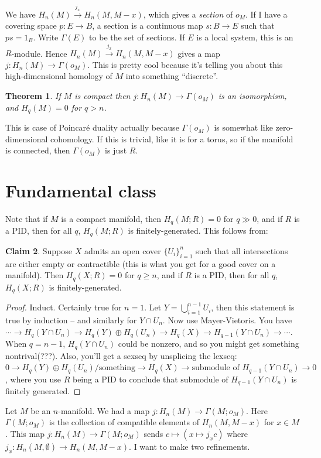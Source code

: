 \documentclass{amsart}
\theoremstyle{theorem}
\newtheorem{theorem}{Theorem}[section]
\theoremstyle{definition}
\newtheorem{claim}[theorem]{Claim}
\begin{document}
We have $H_n(M)\xrightarrow{j_x}H_n(M,M-x)$, which gives a \emph{section} of $o_M$. If I have a covering space $p:E\to B$, a section is a continuous map $s:B\to E$ such that $ps=1_B$. Write $\Gamma(E)$ to be the set of sections. If $E$ is a local system, this is an $R$-module. Hence $H_n(M)\xrightarrow{j_x}H_n(M,M-x)$ gives a map $j:H_n(M)\to \Gamma(o_M)$. This is pretty cool because it's telling you about this high-dimensional homology of $M$ into something ``discrete''.
\begin{theorem}
If $M$ is compact then $j:H_n(M)\to\Gamma(o_M)$ is an isomorphism, and $H_q(M)=0$ for $q>n$.
\end{theorem}
This is case of Poincar\'{e} duality actually because $\Gamma(o_M)$ is somewhat like zero-dimensional cohomology. If this is trivial, like it is for a torus, so if the manifold is connected, then $\Gamma(o_M)$ is just $R$.
\section{Fundamental class}
Note that if $M$ is a compact manifold, then $H_q(M;R)=0$ for $q\gg 0$, and if $R$ is a PID, then for all $q$, $H_q(M;R)$ is finitely-generated. This follows from:
\begin{claim}
Suppose $X$ admits an open cover $\{U_i\}_{i=1}^n$ such that all intersections are either empty or contractible (this is what you get for a good cover on a manifold). Then $H_q(X;R)=0$ for $q\geq n$, and if $R$ is a PID, then for all $q$, $H_q(X;R)$ is finitely-generated.
\end{claim}
\begin{proof}
Induct. Certainly true for $n=1$. Let $Y=\bigcup^{n-1}_{i=1}U_i$, then this statement is true by induction -- and similarly for $Y\cap U_n$. Now use Mayer-Vietoris. You have $\cdots\to H_q(Y\cap U_n)\to H_q(Y)\oplus H_q(U_n)\to H_q(X)\to H_{q-1}(Y\cap U_n)\to\cdots$. When $q=n-1$, $H_q(Y\cap U_n)$ could be nonzero, and so you might get something nontrival(???). Also, you'll get a sexseq by unsplicing the lexseq: $0\to H_q(Y)\oplus H_q(U_n)/\text{something}\to H_q(X)\to \text{submodule of }H_{q-1}(Y\cap U_n)\to 0$, where you use $R$ being a PID to conclude that $\text{submodule of }H_{q-1}(Y\cap U_n)$ is finitely generated.
\end{proof}
Let $M$ be an $n$-manifold. We had a map $j:H_n(M)\to \Gamma(M;o_M)$. Here $\Gamma(M;o_M)$ is the collection of compatible elements of $H_n(M,M-x)$ for $x\in M$. This map $j:H_n(M)\to \Gamma(M;o_M)$ sends $c\mapsto(x\mapsto j_x c)$ where $j_x:H_n(M,\emptyset)\to H_n(M,M-x)$. I want to make two refinements.
\end{document}
